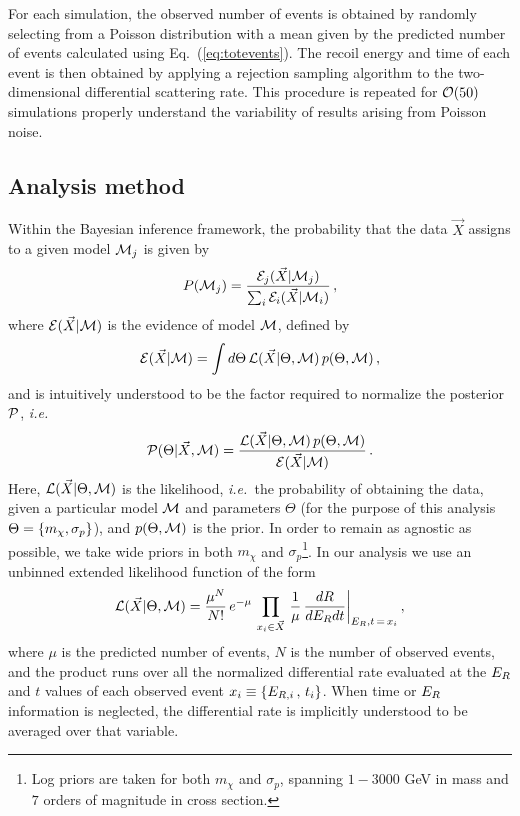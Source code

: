 \documentclass[11pt]{article}
\newcommand{\ie}{{\it i.e.~}}  \newcommand{\eg}{{\it e.g.~}}
\newcommand{\Eq}[1]{Eq.~(\ref{#1})} \newcommand{\Eqs}[2]{Eqs.~(\ref{#1}) and (\ref{#2})} \newcommand{\Eqm}[2]{Eqs.~(\ref{#1}) through (\ref{#2})}
\begin{document}
For each simulation, the observed number of events is obtained by randomly selecting from a Poisson distribution with a mean given by the predicted number of events calculated using \Eq{eq:totevents}. The recoil energy and time of each event is then obtained by applying a rejection sampling algorithm to the two-dimensional differential scattering rate. This procedure is repeated for ${\cal O}(50)$ simulations properly understand the variability of results arising from Poisson noise.

\subsection{Analysis method}\label{sec:stats}

Within the Bayesian inference framework, the probability that the data $\vec{X}$ assigns to a given model ${\cal M}_j$ is given by
\begin{equation}\label{eq:probs}
P({\cal M}_j) = \frac{{\cal E}_j(\vec{X}|{\cal M}_j)}{\sum_i {\cal E}_i(\vec{X}|{\cal M}_i)} \, ,
\end{equation}
where ${\cal E}(\vec{X}|{\cal M})$ is the evidence of model ${\cal M}$, defined by
\begin{equation}\label{eq:evidence}
{\cal E}(\vec{X}|{\cal M}) = \int d\Theta \, {\cal L}(\vec{X}|\Theta,{\cal M}) \, p(\Theta,{\cal M}) \, ,
\end{equation}
and is intuitively understood to be the factor required to normalize the posterior ${ \cal P}$, \ie
\begin{equation}\label{eq:posterior}
{ \cal P}(\Theta | \vec{X}, {\cal M}) = \frac{{\cal L}(\vec{X}|\Theta,{\cal M})\, p(\Theta,{\cal M})}{{\cal E}(\vec{X}|{\cal M})} \, . 
\end{equation}
Here, ${\cal L}(\vec{X}|\Theta,{\cal M})$ is the likelihood, \ie the probability of obtaining the data, given a particular model ${\cal M}$ and parameters $\Theta$ (for the purpose of this analysis $\Theta = \left\{ m_\chi, \sigma_p \right\}$), and $p(\Theta, {\cal M})$ is the prior. In order to remain as agnostic as possible, we take wide priors in both $m_\chi$ and $\sigma_p$\footnote{Log priors are taken for both $m_\chi$ and $\sigma_p$, spanning $1-3000$ GeV in mass and $7$ orders of magnitude in cross section.}. In our analysis we use an unbinned extended likelihood function of the form
\begin{equation}\label{eq:likelihood}
{\cal L}(\vec{X}|\Theta,{\cal M}) = \frac{\mu^N}{N!} \, e^{-\mu} \, \prod_{x_i \in \vec{X}}\, \frac{1}{\mu} \, \frac{dR}{dE_R dt} \bigg|_{E_R,t \, = \, x_i} \, ,
\end{equation}
where $\mu$ is the predicted number of events, $N$ is the number of observed events, and the product runs over all the normalized differential rate evaluated at the $E_R$ and $t$ values of each observed event $x_i \equiv \left\{ E_{R,i} \, , \, t_i \right\}$. When time or $E_R$ information is neglected, the differential rate is implicitly understood to be averaged over that variable. 
\end{document}
